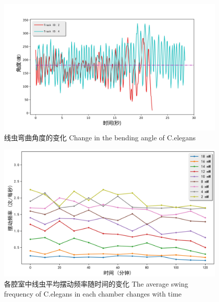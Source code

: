 	 \begin{figure}[h]
	  \centering
	  \includegraphics[width=14cm]{figure/chap5/angle.jpg}
	  \bicaption
		{线虫弯曲角度的变化}
		{Change in the bending angle of C.elegans}
	  \label{fig:angle}
	\end{figure}
	\begin{figure}[!h]
	  \centering
	  \includegraphics[width=13cm]{figure/chap5/res.jpg}
	  \bicaption
		{各腔室中线虫平均摆动频率随时间的变化}
		{The average swing frequency of C.elegans in each chamber changes with time}
	  \label{fig:res}
	\end{figure}
	
